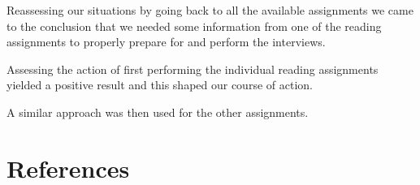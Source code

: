 Reassessing our situations by going back to all the available assignments we came to the conclusion that we needed some information from one of the reading assignments to properly prepare for and perform the interviews.

Assessing the action of first performing the individual reading assignments yielded a positive result and this shaped our course of action.

A similar approach was then used for the other assignments.



\chapter{References}

\begin{thebibliography}{9}
	
\end{thebibliography}


\appendix




